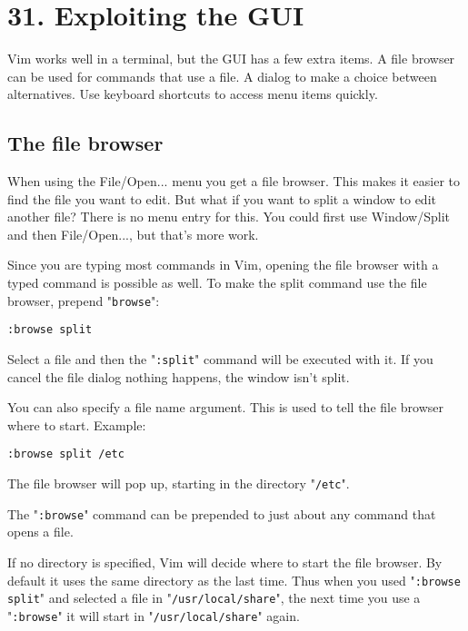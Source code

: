\section{31. Exploiting the GUI}
Vim works well in a terminal, but the GUI has a few extra items.  A file
browser can be used for commands that use a file.  A dialog to make a choice
between alternatives.  Use keyboard shortcuts to access menu items quickly.
\localtableofcontents
\subsection{The file browser}
When using the File/Open... menu you get a file browser.
This makes it easier to find the file you want to edit.
But what if you want to split a window to edit another file?  There is no menu entry for this.
You could first use Window/Split and then File/Open..., but that's more work.

Since you are typing most commands in Vim, opening the file browser with a typed command is possible as well.
To make the split command use the file browser, prepend "\texttt{browse}":

\begin{Verbatim}[samepage=true]
 :browse split
\end{Verbatim}

Select a file and then the "\texttt{:split}" command will be executed with it.
If you cancel the file dialog nothing happens, the window isn't split.

You can also specify a file name argument.
This is used to tell the file browser where to start.
Example:

\begin{Verbatim}[samepage=true]
 :browse split /etc
\end{Verbatim}

The file browser will pop up, starting in the directory "\texttt{/etc}".

The "\texttt{:browse}" command can be prepended to just about any command that opens a file.

If no directory is specified, Vim will decide where to start the file browser.
By default it uses the same directory as the last time.
Thus when you used "\texttt{:browse split}" and selected a file in "\texttt{/usr/local/share}", the next time you use a "\texttt{:browse}" it will start in "\texttt{/usr/local/share}" again.

